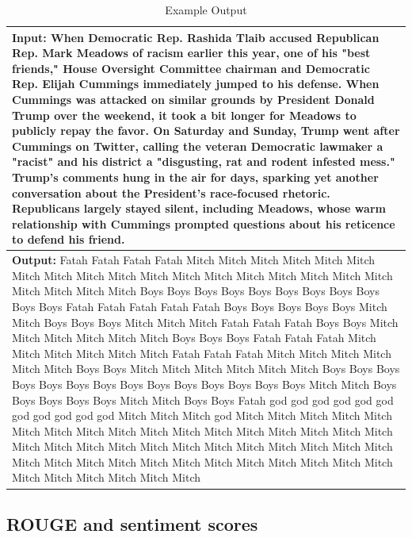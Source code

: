 \documentclass[11pt]{article}
\begin{document}
\begin{table}[h!]
\centering
\begin{tiny}
\begin{tabular}{|p{7cm}|} 
 \hline
 \textbf{Input:} When Democratic Rep. Rashida Tlaib accused Republican Rep. Mark Meadows of racism earlier this year, one of his "best friends," House Oversight Committee chairman and Democratic Rep. Elijah Cummings immediately jumped to his defense. When Cummings was attacked on similar grounds by President Donald Trump over the weekend, it took a bit longer for Meadows to publicly repay the favor. On Saturday and Sunday, Trump went after Cummings on Twitter, calling the veteran Democratic lawmaker a "racist" and his district a "disgusting, rat and rodent infested mess." Trump's comments hung in the air for days, sparking yet another conversation about the President's race-focused rhetoric. Republicans largely stayed silent, including Meadows, whose warm relationship with Cummings prompted questions about his reticence to defend his friend. \\ [0.5ex] 
 \hline
 \textbf{Output:} Fatah Fatah Fatah Fatah Mitch Mitch Mitch Mitch Mitch Mitch Mitch Mitch Mitch Mitch Mitch Mitch Mitch Mitch Mitch Mitch Mitch Mitch Mitch Mitch Mitch Mitch Boys Boys Boys Boys Boys Boys Boys Boys Boys Boys Boys Fatah Fatah Fatah Fatah Fatah Boys Boys Boys Boys Boys Mitch Mitch Boys Boys Boys Mitch Mitch Mitch Fatah Fatah Fatah Boys Boys Mitch Mitch Mitch Mitch Mitch Mitch Boys Boys Boys Fatah Fatah Fatah Mitch Mitch Mitch Mitch Mitch Mitch Fatah Fatah Fatah Mitch Mitch Mitch Mitch Mitch Mitch Boys Boys Mitch Mitch Mitch Mitch Mitch Mitch Boys Boys Boys Boys Boys Boys Boys Boys Boys Boys Boys Boys Boys Boys Mitch Mitch Boys Boys Boys Boys Boys Mitch Mitch Boys Boys Fatah god god god god god god god god god god god Mitch Mitch Mitch god Mitch Mitch Mitch Mitch Mitch Mitch Mitch Mitch Mitch Mitch Mitch Mitch Mitch Mitch Mitch Mitch Mitch Mitch Mitch Mitch Mitch Mitch Mitch Mitch Mitch Mitch Mitch Mitch Mitch Mitch Mitch Mitch Mitch Mitch Mitch Mitch Mitch Mitch Mitch Mitch Mitch Mitch Mitch Mitch Mitch Mitch Mitch  \\ 
 \hline
\end{tabular}
\end{tiny}
\caption{Example Output}
\label{table:example}
\end{table}

\subsection{ROUGE and sentiment scores}
\end{document}
